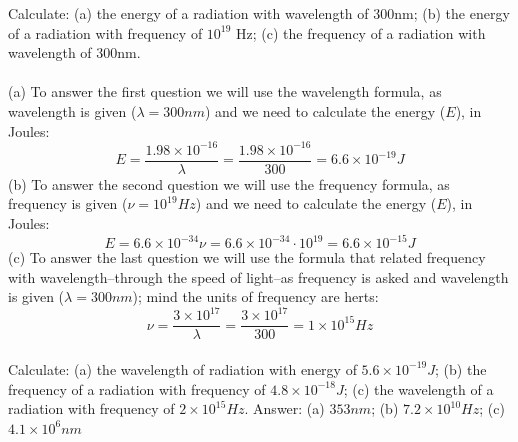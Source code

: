 \documentclass[main.tex]{subfiles}
\begin{document}
\begin{description}
   
   
   
\begin{example} %
Calculate: (a) the energy of a radiation with wavelength of 300nm; (b) the energy of a radiation with frequency of $10^{19}$ Hz; (c) the frequency of a radiation with wavelength of 300nm.\\
\\
(a) To answer the first question we will use the wavelength formula, as wavelength is given ($\lambda=300nm$) and we need to calculate the energy ($E$), in Joules:
\begin{equation*}
E=\frac{1.98\times 10^{-16}}{\lambda}=\frac{1.98\times 10^{-16}}{300}=6.6\times 10^{-19}J
\end{equation*}
(b) To answer the second question we will use the frequency formula, as frequency is given ($\nu=10^{19}Hz$) and we need to calculate the energy ($E$), in Joules:
\begin{equation*}
E=6.6\times 10^{-34}\nu=6.6\times 10^{-34}\cdot 10^{19}=6.6\times 10^{-15}J
\end{equation*}
(c) To answer the last question we will use the formula that related frequency with wavelength--through the speed of light--as frequency is asked and wavelength is given ($\lambda=300nm$); mind the units of frequency are herts:
\begin{equation*}
\nu=\frac{3\times 10^{17}}{\lambda}=  \frac{3\times 10^{17}}{300}=1\times 10^{15}Hz
\end{equation*}
\faDiamond\ \\
Calculate: (a) the wavelength of radiation with energy of $5.6\times 10^{-19}J$; (b) the frequency of a radiation with frequency of $4.8\times 10^{-18}J$; (c) the wavelength of a radiation with frequency of $2\times 10^{15}Hz$.
\flushright Answer: (a) $353nm$; (b) $7.2\times 10^{10}Hz$; (c) $4.1\times 10^{6}nm$
\end{example}%





\end{description}
\end{document}
